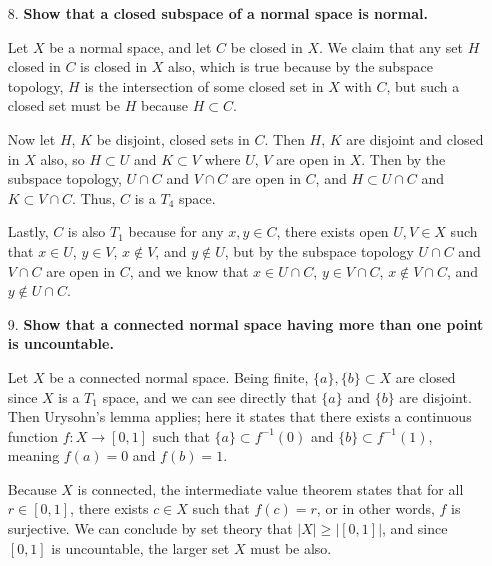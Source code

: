 \documentclass[a4paper,12pt]{article}
\begin{document}
\begin{enumerate}
    \item[8.]
        \boldmath\textbf{Show that a closed subspace of a normal space is normal.
        }\unboldmath \par
        Let $X$ be a normal space, and let $C$ be closed in $X$. We claim that any set $H$ closed in $C$ is closed in $X$ also, which is true because by the subspace topology, $H$ is the intersection of some closed set in $X$ with $C$, but such a closed set must be $H$ because $H \subset C$. \par
        Now let $H$, $K$ be disjoint, closed sets in $C$. Then $H$, $K$ are disjoint and closed in $X$ also, so $H \subset U$ and $K \subset V$ where $U$, $V$ are open in $X$. Then by the subspace topology, $U \cap C$ and $V \cap C$ are open in $C$, and $H \subset U \cap C$ and $K \subset V \cap C$. Thus, $C$ is a $T_4$ space. \par
        Lastly, $C$ is also $T_1$ because for any $x, y \in C$, there exists open $U, V \in X$ such that $x \in U$, $y \in V$, $x \notin V$, and $y \notin U$, but by the subspace topology $U \cap C$ and $V \cap C$ are open in $C$, and we know that $x \in U \cap C$, $y \in V \cap C$, $x \notin V \cap C$, and $y \notin U \cap C$.

    \item[9.]
        \boldmath\textbf{Show that a connected normal space having more than one point is uncountable.
        }\unboldmath \par
        Let $X$ be a connected normal space. Being finite, $\{a\}, \{b\} \subset X$ are closed since $X$ is a $T_1$ space, and we can see directly that $\{a\}$ and $\{b\}$ are disjoint. Then Urysohn's lemma applies; here it states that there exists a continuous function $f : X \to [0, 1]$ such that $\{a\} \subset f^{-1}(0)$ and $\{b\} \subset f^{-1}(1)$, meaning $f(a) = 0$ and $f(b) = 1$. \par
        Because $X$ is connected, the intermediate value theorem states that for all $r \in [0, 1]$, there exists $c \in X$ such that $f(c) = r$, or in other words, $f$ is surjective. We can conclude by set theory that $|X| \geq |[0, 1]|$, and since $[0, 1]$ is uncountable, the larger set $X$ must be also.


\end{enumerate}
\end{document}
